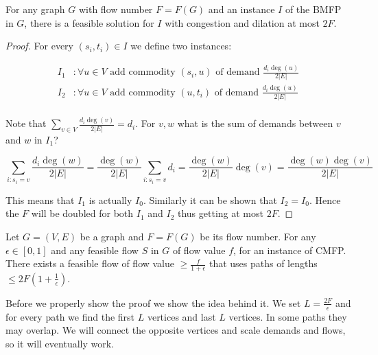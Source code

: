 \begin{claim}
	For any graph $G$ with flow number $F = F(G)$ and an instance $I$ of the BMFP in $G$, there is a feasible solution for $I$ with congestion and dilation at most $2F$.
\end{claim}

\begin{proof}
	For every $(s_{i}, t_{i}) \in I$ we define two instances:
	
	$$
	\begin{aligned}
		I_{1} &: \forall u \in V \text{ add commodity } (s_{i}, u) \text{ of demand } \frac{d_{i} \deg(u)}{2|E|} \\
		I_{2} &: \forall u \in V \text{ add commodity } (u, t_{i}) \text{ of demand } \frac{d_{i} \deg(u)}{2|E|} \\
	\end{aligned}
	$$
	
	Note that $\sum_{v \in V} \frac{d_{i} \deg(v)}{2|E|} = d_{i}$. For $v,w$ what is the sum of demands between $v$ and $w$ in $I_{1}$?
	
	$$
	\sum_{i: s_{i} = v} \frac{d_{i} \deg(w)}{2|E|} = \frac{\deg(w)}{2|E|} \sum_{i: s_{i} = v} d_{i} = \frac{\deg(w)}{2|E|} \deg(v) = \frac{\deg(w) \deg(v)}{2|E|}
	$$
	
	This means that $I_{1}$ is actually $I_{0}$. Similarly it can be shown that $I_{2} = I_{0}$. Hence the $F$ will be doubled for both $I_{1}$ and $I_{2}$ thus getting at most $2F$.
\end{proof}

\begin{lemma}
	Let $G = (V,E)$ be a graph and $F = F(G)$ be its flow number. For any $\epsilon \in [0,1]$ and any feasible flow $S$ in $G$ of flow value $f$, for an instance of CMFP. There exists a feasible flow of flow value $\geq \frac{f}{1+\epsilon}$ that uses paths of lengths $\leq 2F(1+\frac{1}{\epsilon})$.
\end{lemma}

Before we properly show the proof we show the idea behind it. We set $L = \frac{2F}{\epsilon}$ and for every path we find the first $L$ vertices and last $L$ vertices. In some paths they may overlap. We will connect the opposite vertices and scale demands and flows, so it will eventually work.

